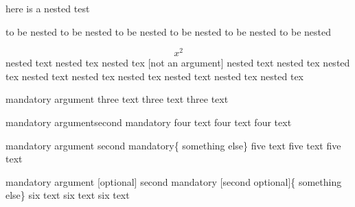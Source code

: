 here is a nested test
\begin{one}
	to be nested to be nested
	to be nested to be nested
	to be nested to be nested
	\begin{two}\[ x^2\]
		nested text nested tex nested tex [not an argument]
		nested text nested tex nested tex
		nested text nested tex nested tex
		nested text nested tex nested tex
	\end{two}
\end{one}
\begin{three}{mandatory argument}
  three text
  three text
  three text
\end{three}
\begin{four}{mandatory argument}{second mandatory}
  four text
  four text
  four text
\end{four}
\begin{five}[optional] {mandatory argument} {second mandatory}\{ something else\}
  five text
  five text
  five text
\end{five}
\begin{six} {mandatory argument}
            [optional] 
            {second mandatory}    [second optional]\{ something else\}   
  six text
  six text
  six text
\end{six}
